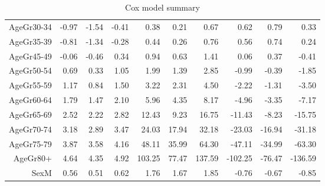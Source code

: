 \begin{table}[ht]
\begin{tabular}{rrrrrrrrrr}
  AgeGr30-34 & -0.97 & -1.54 & -0.41 & 0.38 & 0.21 & 0.67 & 0.62 & 0.79 & 0.33 \\ 
  AgeGr35-39 & -0.81 & -1.34 & -0.28 & 0.44 & 0.26 & 0.76 & 0.56 & 0.74 & 0.24 \\ 
  AgeGr45-49 & -0.06 & -0.46 & 0.34 & 0.94 & 0.63 & 1.41 & 0.06 & 0.37 & -0.41 \\ 
  AgeGr50-54 & 0.69 & 0.33 & 1.05 & 1.99 & 1.39 & 2.85 & -0.99 & -0.39 & -1.85 \\ 
  AgeGr55-59 & 1.17 & 0.84 & 1.50 & 3.22 & 2.31 & 4.50 & -2.22 & -1.31 & -3.50 \\ 
  AgeGr60-64 & 1.79 & 1.47 & 2.10 & 5.96 & 4.35 & 8.17 & -4.96 & -3.35 & -7.17 \\ 
  AgeGr65-69 & 2.52 & 2.22 & 2.82 & 12.43 & 9.23 & 16.75 & -11.43 & -8.23 & -15.75 \\ 
  AgeGr70-74 & 3.18 & 2.89 & 3.47 & 24.03 & 17.94 & 32.18 & -23.03 & -16.94 & -31.18 \\ 
  AgeGr75-79 & 3.87 & 3.58 & 4.16 & 48.11 & 35.99 & 64.30 & -47.11 & -34.99 & -63.30 \\ 
  AgeGr80+ & 4.64 & 4.35 & 4.92 & 103.25 & 77.47 & 137.59 & -102.25 & -76.47 & -136.59 \\ 
  SexM & 0.56 & 0.51 & 0.62 & 1.76 & 1.67 & 1.85 & -0.76 & -0.67 & -0.85 \\ 
   \hline
\end{tabular}
\caption{Cox model summary} 
\end{table}
